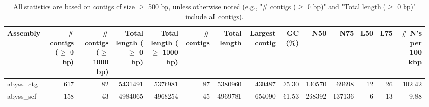 \documentclass[12pt,a4paper]{article}
\begin{document}
\begin{table}[ht]
\begin{center}
\caption{All statistics are based on contigs of size $\geq$ 500 bp, unless otherwise noted (e.g., "\# contigs ($\geq$ 0 bp)" and "Total length ($\geq$ 0 bp)" include all contigs).}
\begin{tabular}{|l*{13}{|r}|}
\hline
Assembly & \# contigs ($\geq$ 0 bp) & \# contigs ($\geq$ 1000 bp) & Total length ($\geq$ 0 bp) & Total length ($\geq$ 1000 bp) & \# contigs & Total length & Largest contig & GC (\%) & N50 & N75 & L50 & L75 & \# N's per 100 kbp \\ \hline
abyss\_ctg & 617 & 82 & 5431491 & 5376981 & 87 & 5380960 & 430487 & 35.30 & 130570 & 69698 & 12 & 26 & 102.42 \\ \hline
abyss\_scf & 158 & 43 & 4984065 & 4968254 & 45 & 4969781 & 654090 & 61.53 & 268392 & 137136 & 6 & 13 & 9.88 \\ \hline
\end{tabular}
\end{center}
\end{table}
\end{document}
